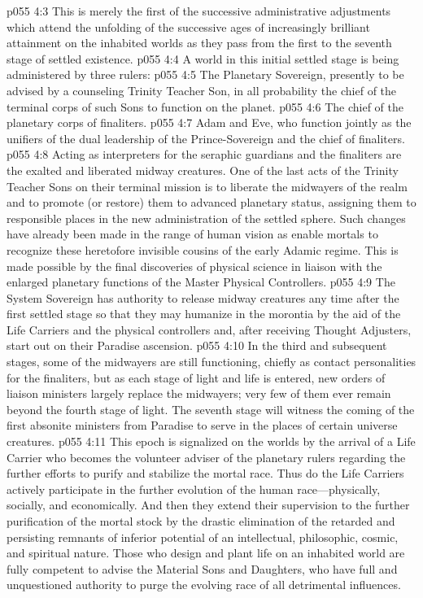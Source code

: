 \vs p055 4:3 This is merely the first of the successive administrative adjustments which attend the unfolding of the successive ages of increasingly brilliant attainment on the inhabited worlds as they pass from the first to the seventh stage of settled existence.
\pc \vs p055 4:4 \bibnobreakspace {} A world in this initial settled stage is being administered by three rulers:
\pc \vs p055 4:5 \bibnobreakspace The Planetary Sovereign, presently to be advised by a counseling Trinity Teacher Son, in all probability the chief of the terminal corps of such Sons to function on the planet.
\vs p055 4:6 \bibnobreakspace The chief of the planetary corps of finaliters.
\vs p055 4:7 \bibnobreakspace Adam and Eve, who function jointly as the unifiers of the dual leadership of the Prince\hyp{}Sovereign and the chief of finaliters.
\pc \vs p055 4:8 Acting as interpreters for the seraphic guardians and the finaliters are the exalted and liberated midway creatures. One of the last acts of the Trinity Teacher Sons on their terminal mission is to liberate the midwayers of the realm and to promote (or restore) them to advanced planetary status, assigning them to responsible places in the new administration of the settled sphere. Such changes have already been made in the range of human vision as enable mortals to recognize these heretofore invisible cousins of the early Adamic regime. This is made possible by the final discoveries of physical science in liaison with the enlarged planetary functions of the Master Physical Controllers.
\vs p055 4:9 The System Sovereign has authority to release midway creatures any time after the first settled stage so that they may humanize in the morontia by the aid of the Life Carriers and the physical controllers and, after receiving Thought Adjusters, start out on their Paradise ascension.
\vs p055 4:10 In the third and subsequent stages, some of the midwayers are still functioning, chiefly as contact personalities for the finaliters, but as each stage of light and life is entered, new orders of liaison ministers largely replace the midwayers; very few of them ever remain beyond the fourth stage of light. The seventh stage will witness the coming of the first absonite ministers from Paradise to serve in the places of certain universe creatures.
\pc \vs p055 4:11 \bibnobreakspace {} This epoch is signalized on the worlds by the arrival of a Life Carrier who becomes the volunteer adviser of the planetary rulers regarding the further efforts to purify and stabilize the mortal race. Thus do the Life Carriers actively participate in the further evolution of the human race---physically, socially, and economically. And then they extend their supervision to the further purification of the mortal stock by the drastic elimination of the retarded and persisting remnants of inferior potential of an intellectual, philosophic, cosmic, and spiritual nature. Those who design and plant life on an inhabited world are fully competent to advise the Material Sons and Daughters, who have full and unquestioned authority to purge the evolving race of all detrimental influences.
